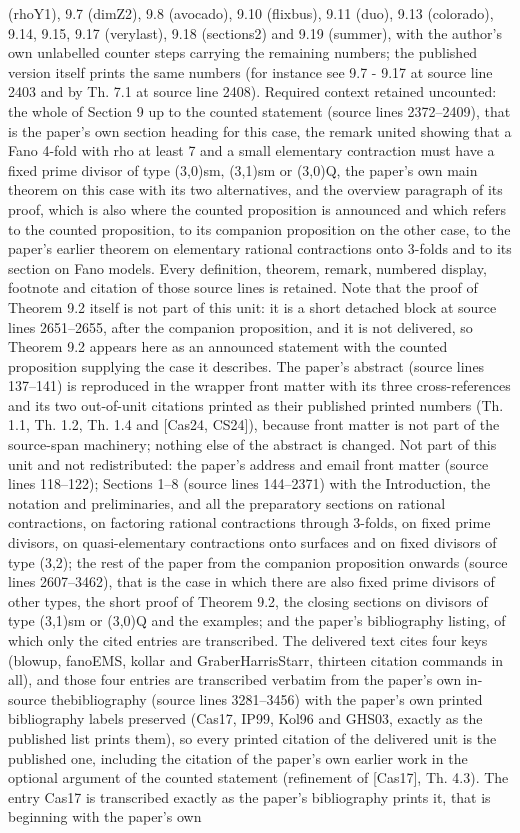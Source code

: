 \documentclass[10pt,a4paper]{amsart}
\theoremstyle{definition}
\numberwithin{figure}{section}
\numberwithin{table}{section}
\begin{document}
(rhoY1), 9.7 (dimZ2), 9.8 (avocado), 9.10 (flixbus), 9.11 (duo), 9.13 (colorado), 9.14, 9.15, 9.17 (verylast), 9.18 (sections2) and 9.19 (summer), with the author's own unlabelled counter steps carrying the remaining numbers; the published version itself prints the same numbers (for instance see 9.7 - 9.17 at source line 2403 and by Th. 7.1 at source line 2408). Required context retained uncounted: the whole of Section 9 up to the counted statement (source lines 2372--2409), that is the paper's own section heading for this case, the remark united showing that a Fano 4-fold with rho at least 7 and a small elementary contraction must have a fixed prime divisor of type (3,0)sm, (3,1)sm or (3,0)Q, the paper's own main theorem on this case with its two alternatives, and the overview paragraph of its proof, which is also where the counted proposition is announced and which refers to the counted proposition, to its companion proposition on the other case, to the paper's earlier theorem on elementary rational contractions onto 3-folds and to its section on Fano models. Every definition, theorem, remark, numbered display, footnote and citation of those source lines is retained. Note that the proof of Theorem 9.2 itself is not part of this unit: it is a short detached block at source lines 2651--2655, after the companion proposition, and it is not delivered, so Theorem 9.2 appears here as an announced statement with the counted proposition supplying the case it describes. The paper's abstract (source lines 137--141) is reproduced in the wrapper front matter with its three cross-references and its two out-of-unit citations printed as their published printed numbers (Th. 1.1, Th. 1.2, Th. 1.4 and [Cas24, CS24]), because front matter is not part of the source-span machinery; nothing else of the abstract is changed. Not part of this unit and not redistributed: the paper's address and email front matter (source lines 118--122); Sections 1--8 (source lines 144--2371) with the Introduction, the notation and preliminaries, and all the preparatory sections on rational contractions, on factoring rational contractions through 3-folds, on fixed prime divisors, on quasi-elementary contractions onto surfaces and on fixed divisors of type (3,2); the rest of the paper from the companion proposition onwards (source lines 2607--3462), that is the case in which there are also fixed prime divisors of other types, the short proof of Theorem 9.2, the closing sections on divisors of type (3,1)sm or (3,0)Q and the examples; and the paper's bibliography listing, of which only the cited entries are transcribed. The delivered text cites four keys (blowup, fanoEMS, kollar and GraberHarrisStarr, thirteen citation commands in all), and those four entries are transcribed verbatim from the paper's own in-source thebibliography (source lines 3281--3456) with the paper's own printed bibliography labels preserved (Cas17, IP99, Kol96 and GHS03, exactly as the published list prints them), so every printed citation of the delivered unit is the published one, including the citation of the paper's own earlier work in the optional argument of the counted statement (refinement of [Cas17], Th. 4.3). The entry Cas17 is transcribed exactly as the paper's bibliography prints it, that is beginning with the paper's own 
\end{document}
